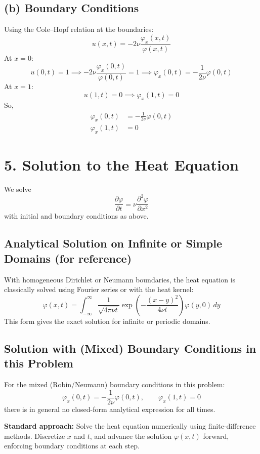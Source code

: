 \documentclass[12pt]{article}
\begin{document}
\subsection*{(b) Boundary Conditions}

Using the Cole--Hopf relation at the boundaries:
\[
u(x, t) = -2\nu \frac{\varphi_x(x, t)}{\varphi(x, t)}
\]
At $x = 0$:
\[
u(0, t) = 1 \implies -2\nu \frac{\varphi_x(0, t)}{\varphi(0, t)} = 1 
\implies \varphi_x(0, t) = -\frac{1}{2\nu} \varphi(0, t)
\]
At $x = 1$:
\[
u(1, t) = 0 \implies \varphi_x(1, t) = 0
\]
So,
\[
\boxed{
\begin{aligned}
\varphi_x(0, t) &= -\frac{1}{2\nu} \varphi(0, t) \\
\varphi_x(1, t) &= 0
\end{aligned}
}
\]

\section*{5. Solution to the Heat Equation}

We solve
\[
\frac{\partial \varphi}{\partial t} = \nu \frac{\partial^2 \varphi}{\partial x^2}
\]
with initial and boundary conditions as above.

\subsection*{Analytical Solution on Infinite or Simple Domains (for reference)}
With homogeneous Dirichlet or Neumann boundaries, the heat equation is classically solved using Fourier series or with the heat kernel:
\[
\varphi(x, t) = \int_{-\infty}^{\infty}
    \frac{1}{\sqrt{4\pi \nu t}}
    \exp\left( -\frac{(x-y)^2}{4\nu t} \right)
    \varphi(y, 0)\,dy
\]
This form gives the exact solution for infinite or periodic domains.

\subsection*{Solution with (Mixed) Boundary Conditions in this Problem}
For the mixed (Robin/Neumann) boundary conditions in this problem:
\[
\varphi_x(0, t) = -\frac{1}{2\nu} \varphi(0, t),\qquad \varphi_x(1, t) = 0
\]
there is in general no closed-form analytical expression for all times. 

\textbf{Standard approach:} Solve the heat equation numerically using finite-difference methods. Discretize $x$ and $t$, and advance the solution $\varphi(x, t)$ forward, enforcing boundary conditions at each step.
\end{document}
